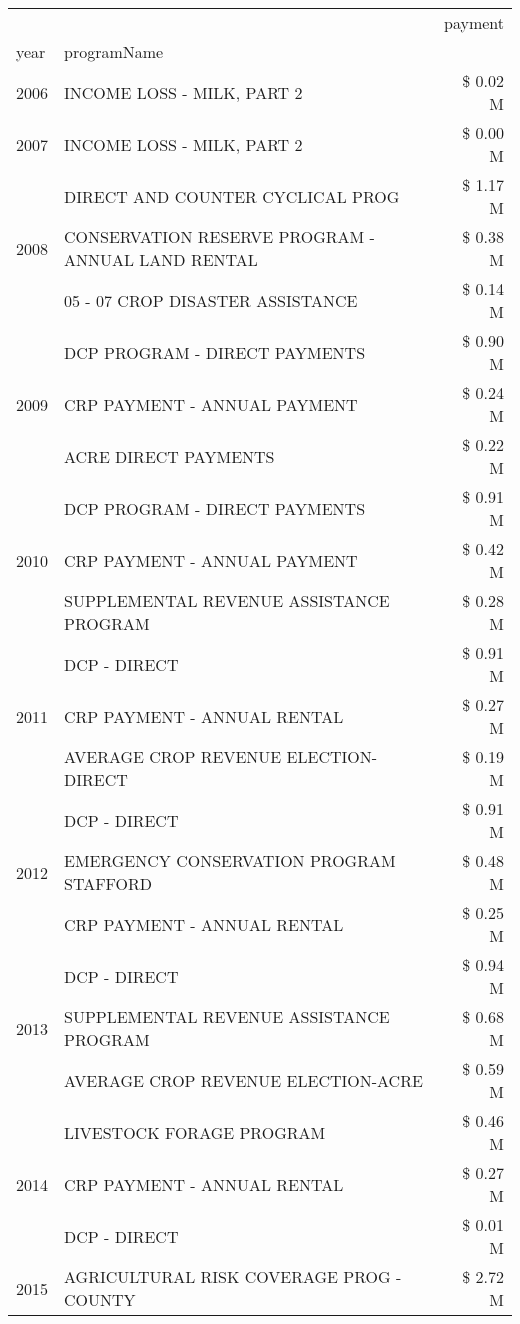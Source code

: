 \begin{tabular}{llr}
\toprule
 &  & payment \\
year & programName &  \\
\midrule
2006 & INCOME LOSS - MILK, PART 2 & \$ 0.02 M \\
\cline{1-3}
2007 & INCOME LOSS - MILK, PART 2 & \$ 0.00 M \\
\cline{1-3}
\multirow[t]{3}{*}{2008} & DIRECT AND COUNTER CYCLICAL PROG & \$ 1.17 M \\
 & CONSERVATION RESERVE PROGRAM - ANNUAL LAND RENTAL & \$ 0.38 M \\
 & 05 - 07 CROP DISASTER ASSISTANCE & \$ 0.14 M \\
\cline{1-3}
\multirow[t]{3}{*}{2009} & DCP PROGRAM - DIRECT PAYMENTS & \$ 0.90 M \\
 & CRP PAYMENT - ANNUAL PAYMENT & \$ 0.24 M \\
 & ACRE DIRECT PAYMENTS & \$ 0.22 M \\
\cline{1-3}
\multirow[t]{3}{*}{2010} & DCP PROGRAM - DIRECT PAYMENTS & \$ 0.91 M \\
 & CRP PAYMENT - ANNUAL PAYMENT & \$ 0.42 M \\
 & SUPPLEMENTAL REVENUE ASSISTANCE PROGRAM & \$ 0.28 M \\
\cline{1-3}
\multirow[t]{3}{*}{2011} & DCP - DIRECT & \$ 0.91 M \\
 & CRP PAYMENT - ANNUAL RENTAL & \$ 0.27 M \\
 & AVERAGE CROP REVENUE ELECTION-DIRECT & \$ 0.19 M \\
\cline{1-3}
\multirow[t]{3}{*}{2012} & DCP - DIRECT & \$ 0.91 M \\
 & EMERGENCY CONSERVATION PROGRAM STAFFORD & \$ 0.48 M \\
 & CRP PAYMENT - ANNUAL RENTAL & \$ 0.25 M \\
\cline{1-3}
\multirow[t]{3}{*}{2013} & DCP - DIRECT & \$ 0.94 M \\
 & SUPPLEMENTAL REVENUE ASSISTANCE PROGRAM & \$ 0.68 M \\
 & AVERAGE CROP REVENUE ELECTION-ACRE & \$ 0.59 M \\
\cline{1-3}
\multirow[t]{3}{*}{2014} & LIVESTOCK FORAGE PROGRAM & \$ 0.46 M \\
 & CRP PAYMENT - ANNUAL RENTAL & \$ 0.27 M \\
 & DCP - DIRECT & \$ 0.01 M \\
\cline{1-3}
\multirow[t]{3}{*}{2015} & AGRICULTURAL RISK COVERAGE PROG - COUNTY & \$ 2.72 M \\

\end{tabular}

